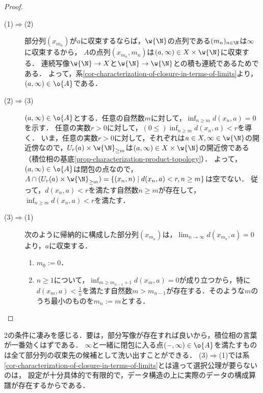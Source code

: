 \documentclass[uplatex,dvipdfmx]{jsreport}
\begin{document}
\begin{proof}\mbox{}
    \begin{description}
        \item[(1)$\Rightarrow$(2)] 
        部分列$(x_{m_n})$が$a$に収束するならば，$\w{\N}$の点列である$(m_n)_{n\in\N}$は$\infty$に収束するから，
        $A$の点列$(x_{m_n},m_n)$は$(a,\infty)\in X\times\w{\N}$に収束する．
        連続写像$\w{\N}\to X$と$\w{\N}\to\w{\N}$との積も連続であるためである．
        よって，系\ref{cor-characterization-of-closure-in-terms-of-limits}より，$(a,\infty)\in\o{A}$である．
        \item[(2)$\Rightarrow$(3)]
        $(a,\infty)\in\o{A}$とする．任意の自然数$m$に対して，$\inf_{n\ge m}d(x_n,a)=0$を示す．
        任意の実数$r>0$に対して，$(0\le)\inf_{n\ge m}d(x_n,a)<r$を導く．
        いま，任意の実数$r>0$に対して，それぞれは$a\in X,\infty\in\w{\N}$の開近傍なので，$U_r(a)\times\w{\N}_{\ge m}$は$(a,\infty)\in X\times\w{\N}$の開近傍である（積位相の基底\ref{prop-characterization-product-topology}）．
        よって，$(a,\infty)\in\o{A}$は閉包の点なので，$A\cap(U_r(a)\times\w{\N}_{\ge m})=\{(x_n,n)\mid d(x_n,a)<r,n\ge m\}$は空でない．
        従って，$d(x_n,a)<r$を満たす自然数$n\ge m$が存在して，$\inf_{n\ge m}d(x_n,a)<r$を満たす．
        \item[(3)$\Rightarrow$(1)]
        次のように帰納的に構成した部分列$(x_{m_n})$は，$\lim_{n\to\infty}d(x_{m_n},a)=0$より，$a$に収束する．
        \begin{enumerate}
            \item $m_0:=0$．
            \item $n\ge 1$について，$\inf_{m\ge m_{n-1}+1}d(x_m,a)=0$が成り立つから，特に$d(x_m,a)<\frac{1}{n}$を満たす自然数$m>m_{n-1}$が存在する．そのような$m$のうち最小のものを$m_n:=m$とする．
        \end{enumerate}
    \end{description}
\end{proof}
\begin{remarks}
    2の条件に凄みを感じる．要は，部分写像が存在すれば良いから，積位相の言葉が一番効くはずである．
    $\infty$と一緒に閉包に入る点$(-,\infty)\in\o{A}$を満たすものは全て部分列の収束先の候補として洗い出すことができる．
    (3)$\Rightarrow$(1)では系\ref{cor-characterization-of-closure-in-terms-of-limits}とは違って選択公理が要らないのは，
    設定が十分具体的で有限的で，データ構造の上に実際のデータの構成算譜が存在するからである．
\end{remarks}
\end{document}
